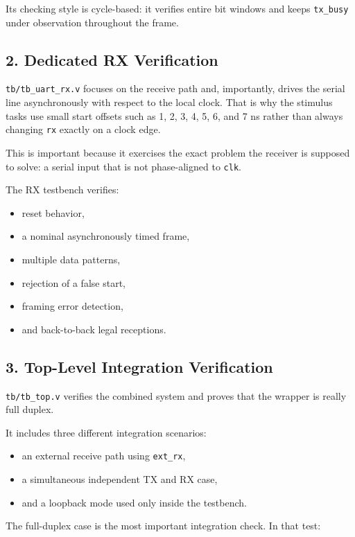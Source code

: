 \documentclass[12pt]{article}
\begin{document}
Its checking style is cycle-based: it verifies entire bit windows and keeps
\texttt{tx\_busy} under observation throughout the frame.

\subsection*{2. Dedicated RX Verification}

\texttt{tb/tb\_uart\_rx.v} focuses on the receive path and, importantly, drives
the serial line asynchronously with respect to the local clock. That is why the
stimulus tasks use small start offsets such as 1, 2, 3, 4, 5, 6, and 7 ns rather
than always changing \texttt{rx} exactly on a clock edge.

This is important because it exercises the exact problem the receiver is supposed
to solve: a serial input that is not phase-aligned to \texttt{clk}.

The RX testbench verifies:

\begin{itemize}
    \item reset behavior,
    \item a nominal asynchronously timed frame,
    \item multiple data patterns,
    \item rejection of a false start,
    \item framing error detection,
    \item and back-to-back legal receptions.
\end{itemize}

\subsection*{3. Top-Level Integration Verification}

\texttt{tb/tb\_top.v} verifies the combined system and proves that the wrapper is
really full duplex.

It includes three different integration scenarios:

\begin{itemize}
    \item an external receive path using \texttt{ext\_rx},
    \item a simultaneous independent TX and RX case,
    \item and a loopback mode used only inside the testbench.
\end{itemize}

The full-duplex case is the most important integration check. In that test:
\end{document}
